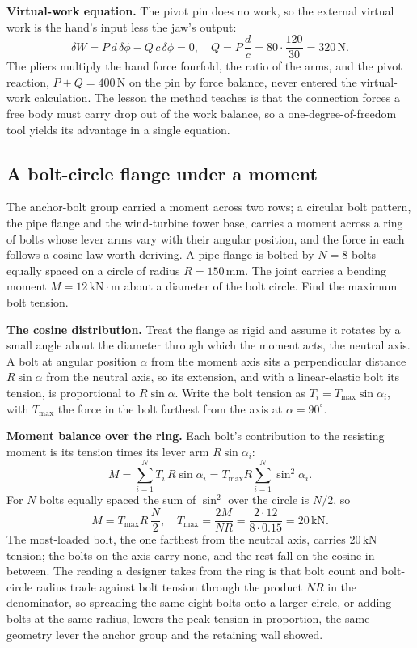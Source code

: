 \textbf{Virtual-work equation.} The pivot pin does no work, so the
external virtual work is the hand's input less the jaw's output:
\[
\delta W = P\,d\,\delta\phi - Q\,c\,\delta\phi = 0, \quad
Q = P\,\frac{d}{c} = 80\cdot\frac{120}{30} = 320\,\text{N}.
\]
The pliers multiply the hand force fourfold, the ratio of the arms, and
the pivot reaction, $P + Q = 400\,\text{N}$ on the pin by force balance,
never entered the virtual-work calculation. The lesson the method teaches
is that the connection forces a free body must carry drop out of the
work balance, so a one-degree-of-freedom tool yields its advantage in a
single equation.

\subsection{A bolt-circle flange under a moment}

The anchor-bolt group carried a moment across two rows; a circular bolt
pattern, the pipe flange and the wind-turbine tower base, carries a
moment across a ring of bolts whose lever arms vary with their angular
position, and the force in each follows a cosine law worth deriving. A
pipe flange is bolted by $N = 8$ bolts equally spaced on a circle of
radius $R = 150\,\si{\milli\meter}$. The joint carries a bending moment
$M = 12\,\text{kN}\cdot\text{m}$ about a diameter of the bolt circle.
Find the maximum bolt tension.

\textbf{The cosine distribution.} Treat the flange as rigid and assume it
rotates by a small angle about the diameter through which the moment acts,
the neutral axis. A bolt at angular position $\alpha$ from the moment axis
sits a perpendicular distance $R\sin\alpha$ from the neutral axis, so its
extension, and with a linear-elastic bolt its tension, is proportional to
$R\sin\alpha$. Write the bolt tension as $T_i = T_{\max}\sin\alpha_i$,
with $T_{\max}$ the force in the bolt farthest from the axis at
$\alpha = 90^{\circ}$.

\textbf{Moment balance over the ring.} Each bolt's contribution to the
resisting moment is its tension times its lever arm $R\sin\alpha_i$:
\[
M = \sum_{i=1}^{N} T_i\,R\sin\alpha_i
= T_{\max}R\sum_{i=1}^{N}\sin^2\alpha_i.
\]
For $N$ bolts equally spaced the sum of $\sin^2$ over the circle is
$N/2$, so
\[
M = T_{\max}R\,\frac{N}{2}, \quad
T_{\max} = \frac{2M}{NR}
= \frac{2\cdot 12}{8\cdot 0.15} = 20\,\text{kN}.
\]
The most-loaded bolt, the one farthest from the neutral axis, carries
$20\,\text{kN}$ tension; the bolts on the axis carry none, and the rest
fall on the cosine in between. The reading a designer takes from the ring
is that bolt count and bolt-circle radius trade against bolt tension
through the product $NR$ in the denominator, so spreading the same eight
bolts onto a larger circle, or adding bolts at the same radius, lowers the
peak tension in proportion, the same geometry lever the anchor group and
the retaining wall showed.

